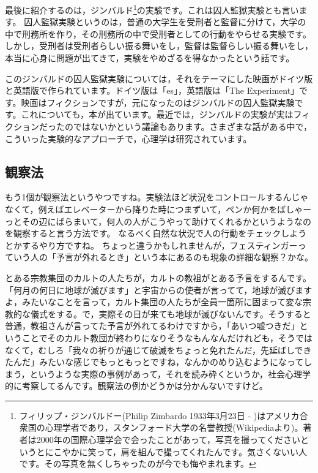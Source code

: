 \documentclass{ltjsbook}
\begin{document}
最後に紹介するのは，ジンバルド\footnote{フィリップ・ジンバルドー(Philip Zimbardo 1933年3月23日 - )はアメリカ合衆国の心理学者であり，スタンフォード大学の名誉教授(Wikipediaより)。著者は2000年の国際心理学会で会ったことがあって，写真を撮ってくださいというとにこやかに笑って，肩を組んで撮ってくれたんです。気さくないい人です。その写真を無くしちゃったのが今でも悔やまれます。}の実験です。これは囚人監獄実験とも言います。
囚人監獄実験というのは，普通の大学生を受刑者と監督に分けて，大学の中で刑務所を作り，その刑務所の中で受刑者としての行動をやらせる実験です。しかし，受刑者は受刑者らしい振る舞いをし，監督は監督らしい振る舞いをし，本当に心身に問題が出てきて，実験をやめざるを得なかったという話です。

このジンバルドの囚人監獄実験については，それをテーマにした映画がドイツ版と英語版で作られています。ドイツ版は「es」，英語版は「The Experiment」です。映画はフィクションですが，元になったのはジンバルドの囚人監獄実験です。これについても，本が出ています。最近では，ジンバルドの実験が実はフィクションだったのではないかという議論もあります。さまざまな話がある中で，こういった実験的なアプローチで，心理学は研究されています。

\subsection{観察法}
もう1個が観察法というやつですね。実験法ほど状況をコントロールするんじゃなくて，例えばエレベーターから降りた時につまずいて，ペンか何かをばしゃーっとその辺にばらまいて，何人の人がこうやって助けてくれるかというようなのを観察すると言う方法です。
なるべく自然な状況で人の行動をチェックしようとかするやり方ですね。
ちょっと違うかもしれませんが，フェスティンガーっていう人の「予言が外れるとき」という本にあるのも現象の詳細な観察？かな。

とある宗教集団のカルトの人たちが，カルトの教祖がとある予言をするんです。「何月の何日に地球が滅びます」と宇宙からの使者が言ってて，地球が滅びますよ，みたいなことを言って，カルト集団の人たちが全員一箇所に固まって変な宗教的な儀式をする。で，実際その日が来ても地球が滅びないんです。そうすると普通，教祖さんが言ってた予言が外れてるわけですから，「あいつ嘘つきだ」ということでそのカルト教団が終わりになりそうなもんなんだけれども，そうではなくて，むしろ「我々の祈りが通じて破滅をちょっと免れたんだ，先延ばしできたんだ」みたいな感じでもっともっとですね，なんかのめり込むようになってしまう，というような実際の事例があって，それを読み砕くというか，社会心理学的に考察してるんです。観察法の例かどうかは分かんないですけど。
\end{document}
